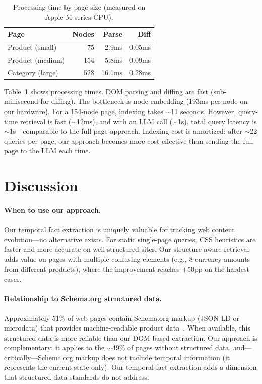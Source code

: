 \documentclass[11pt]{article}
\begin{document}
\begin{table}[t]
\centering
\caption{Processing time by page size (measured on Apple M-series CPU).}
\label{tab:scale}
\begin{tabular}{lrrr}
\toprule
\textbf{Page} & \textbf{Nodes} & \textbf{Parse} & \textbf{Diff} \\
\midrule
Product (small) & 75 & 2.9ms & 0.05ms \\
Product (medium) & 154 & 5.8ms & 0.09ms \\
Category (large) & 528 & 16.1ms & 0.28ms \\
\bottomrule
\end{tabular}
\end{table}

Table~\ref{tab:scale} shows processing times. DOM parsing and diffing are fast (sub-millisecond for diffing). The bottleneck is node embedding (193ms per node on our hardware). For a 154-node page, indexing takes $\sim$11 seconds. However, query-time retrieval is fast ($\sim$12ms), and with an LLM call ($\sim$1s), total query latency is $\sim$1s---comparable to the full-page approach. Indexing cost is amortized: after $\sim$22 queries per page, our approach becomes more cost-effective than sending the full page to the LLM each time.

\section{Discussion}
\label{sec:discussion}

\paragraph{When to use our approach.} Our temporal fact extraction is uniquely valuable for tracking web content evolution---no alternative exists. For static single-page queries, CSS heuristics are faster and more accurate on well-structured sites. Our structure-aware retrieval adds value on pages with multiple confusing elements (e.g., 8 currency amounts from different products), where the improvement reaches +50pp on the hardest cases.

\paragraph{Relationship to Schema.org structured data.} Approximately 51\% of web pages contain Schema.org markup (JSON-LD or microdata) that provides machine-readable product data~\cite{schemaorg2016}. When available, this structured data is more reliable than our DOM-based extraction. Our approach is complementary: it applies to the $\sim$49\% of pages without structured data, and---critically---Schema.org markup does not include temporal information (it represents the current state only). Our temporal fact extraction adds a dimension that structured data standards do not address.
\end{document}
